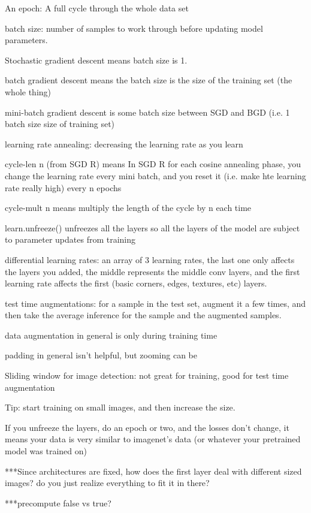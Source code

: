 \documentclass[12pt]{article}
\begin{document}
An epoch: A full cycle through the whole data set

batch size: number of samples to work through before updating model parameters.

Stochastic gradient descent means batch size is 1.

batch gradient descent means the batch size is the size of the training set (the whole thing)

mini-batch gradient descent is some batch size between SGD and BGD (i.e. 1 \ls batch size \ls size of training set)



learning rate annealing:  decreasing the learning rate as you learn


cycle-len \eql n (from SGD R) means 
In SGD R for each cosine annealing phase, you change the learning rate every mini batch, and you reset it (i.e. make hte learning rate really high) every n epochs

cycle-mult \eql n means multiply the length of the cycle by n each time


learn.unfreeze() unfreezes all the layers so all the layers of the model are subject to parameter updates from training

differential learning rates: an array of 3 learning rates, the last one only affects the layers you added, the middle represents the middle conv layers, and the first learning rate affects the first (basic corners, edges, textures, etc) layers.

test time augmentations: for a sample in the test set, augment it a few times, and then take the average inference for the sample and the augmented samples.

data augmentation in general is only during training time

padding in general isn't helpful, but zooming can be

Sliding window for image detection: not great for training, good for test time augmentation

Tip: start training on small images, and then increase the size.

If you unfreeze the layers, do an epoch or two, and the losses don't change, it means your data is very similar to imagenet's data (or whatever your pretrained model was trained on)


***Since architectures are fixed, how does the first layer deal with different sized images? do you just realize everything to fit it in there?

***precompute \eql false vs true?
\end{document}

